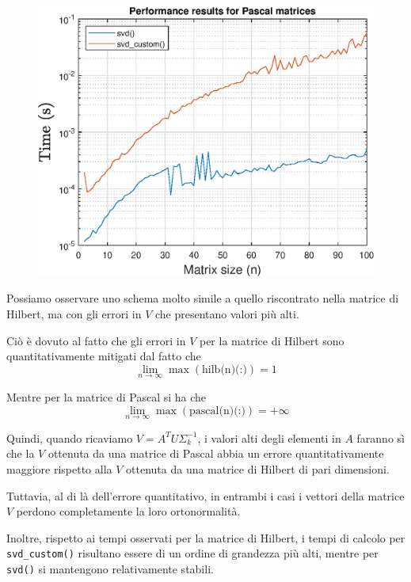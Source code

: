\begin{figure}[!htb]
\includegraphics[width=\linewidth]{imgs/09_-_Performance_results_for_Pascal_matrices.eps}
\endminipage
\end{figure}

Possiamo osservare uno schema molto simile a quello riscontrato nella matrice di 
Hilbert, ma con gli errori in $V$ che presentano valori più alti.

Ciò è dovuto al fatto che gli errori in $V$ per la matrice di Hilbert sono 
quantitativamente mitigati dal fatto che
\begin{equation*}
	\lim_{n \to \infty} \max(\text{hilb(n)(:)}) = 1
\end{equation*}

Mentre per la matrice di Pascal si ha che
\begin{equation*}
	\lim_{n \to \infty} \max(\text{pascal(n)(:)}) = +\infty
\end{equation*}

Quindi, quando ricaviamo $V = A^T U \Sigma_{k}^{-1}$, i valori alti degli 
elementi in $A$ faranno sì che la $V$ ottenuta da una matrice di Pascal abbia un 
errore quantitativamente maggiore rispetto alla $V$ ottenuta da una matrice di 
Hilbert di pari dimensioni.

Tuttavia, al di là dell'errore quantitativo, in entrambi i casi i vettori della 
matrice $V$ perdono completamente la loro ortonormalità.

Inoltre, rispetto ai tempi osservati per la matrice di Hilbert, i tempi di 
calcolo per \texttt{svd\_custom()} risultano essere di un ordine di grandezza 
più alti, mentre per \texttt{svd()} si mantengono relativamente stabili.

